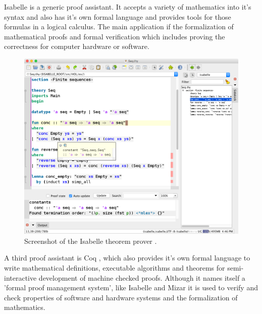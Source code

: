 Isabelle \cite{isabelle} is a generic proof assistant. It accepts a variety of mathematics into it's syntax and also has it's own formal language and provides tools for those formulas in a logical calculus. The main application if the formalization of mathematical proofs and formal verification which includes proving the correctness for computer hardware or software.

\begin{figure}[H]
\begin{center}
\includegraphics[scale=0.4]{Figures/Background/isabelle.png}
\end{center}
\caption{Screenshot of the Isabelle theorem prover \cite{isabelle}. \label{fig:isabelle}}
\end{figure}

A third proof assistant is Coq \cite{coq}, which also provides it's own formal language to write mathematical definitions, executable algorithms and theorems for semi-interactive development of machine checked proofs. Although it names itself a 'formal proof management system', like Isabelle and Mizar it is used to verify and check properties of software and hardware systems and the formalization of mathematics.

